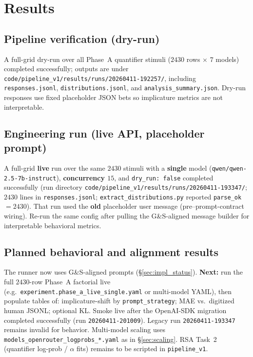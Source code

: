 \documentclass[11pt]{article}
\begin{document}
\section{Results}
\label{sec:results}

\subsection{Pipeline verification (dry-run)}
A full-grid dry-run over all Phase~A quantifier stimuli ($2430$ rows $\times$ $7$ models) completed successfully; outputs are under \texttt{code/pipeline\_v1/results/runs/20260411-192257/}, including \texttt{responses.jsonl}, \texttt{distributions.jsonl}, and \texttt{analysis\_summary.json}. Dry-run responses use fixed placeholder JSON bets so implicature metrics are not interpretable.

\subsection{Engineering run (live API, placeholder prompt)}
A full-grid \textbf{live} run over the same $2430$ stimuli with a \textbf{single} model (\texttt{qwen/qwen-2.5-7b-instruct}), \textbf{concurrency $15$}, and \texttt{dry\_run: false} completed successfully (run directory \texttt{code/pipeline\_v1/results/runs/20260411-193347/}; $2430$ lines in \texttt{responses.jsonl}; \texttt{extract\_distributions.py} reported \texttt{parse\_ok}$=2430$). That run used the \textbf{old} placeholder user message (pre--prompt-contract wiring). Re-run the same config after pulling the G\&S-aligned message builder for interpretable behavioral metrics.

\subsection{Planned behavioral and alignment results}
The runner now uses G\&S-aligned prompts (\S\ref{sec:impl_status}). \textbf{Next:} run the full $2430$-row Phase~A factorial live (e.g.\ \texttt{experiment.phase\_a\_live\_single.yaml} or multi-model YAML), then populate tables of: implicature-shift by \texttt{prompt\_strategy}; MAE vs.\ digitized human JSONL; optional KL. Smoke live after the OpenAI-SDK migration completed successfully (run \texttt{20260411-201009}). Legacy run \texttt{20260411-193347} remains invalid for behavior. Multi-model scaling uses \texttt{models\_openrouter\_logprobs\_*.yaml} as in \S\ref{sec:scaling}. RSA Task~2 (quantifier log-prob / $\alpha$ fits) remains to be scripted in \texttt{pipeline\_v1}.
\end{document}
